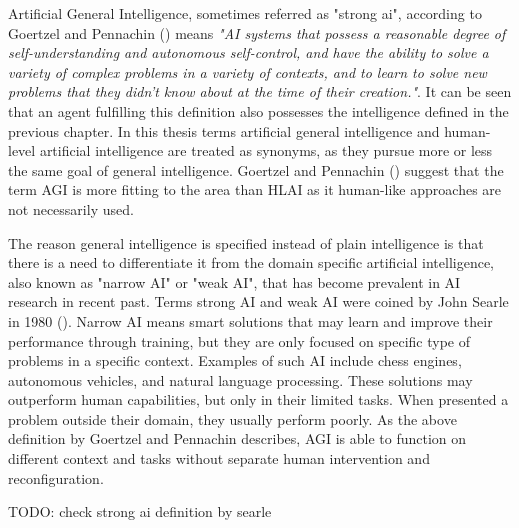 \documentclass[utf8,english]{gradu3}
\begin{document}


Artificial General Intelligence, sometimes referred as "strong ai", according to
Goertzel and Pennachin (\cite*{goertzel2007}) means \emph{"AI systems that
  possess a reasonable degree of self-understanding and autonomous self-control,
  and have the ability to solve a variety of complex problems in a variety of
  contexts, and to learn to solve new problems that they didn't know about at the
  time of their creation."}. It can be seen that an agent fulfilling this
definition also possesses the intelligence defined in the previous chapter. In
this thesis terms artificial general intelligence and human-level artificial
intelligence are treated as synonyms, as they pursue more or less the same goal
of general intelligence. Goertzel and Pennachin (\cite*{goertzel2007}) suggest
that the term AGI is more fitting to the area than HLAI as it human-like
approaches are not necessarily used.

The reason general intelligence is specified instead of plain intelligence is
that there is a need to differentiate it from the domain specific artificial
intelligence, also known as "narrow AI" or "weak AI", that has become prevalent
in AI research in recent past. Terms strong AI and weak AI were coined by John
Searle in 1980 (\cite{searle1980}). Narrow AI means smart solutions that may
learn and improve their performance through training, but they are only focused
on specific type of problems in a specific context. Examples of such AI include
chess engines, autonomous vehicles, and natural language processing. These
solutions may outperform human capabilities, but only in their limited tasks.
When presented a problem outside their domain, they usually perform poorly. As
the above definition by Goertzel and Pennachin describes, AGI is able to
function on different context and tasks without separate human intervention and
reconfiguration.

TODO: check strong ai definition by searle
\end{document}
